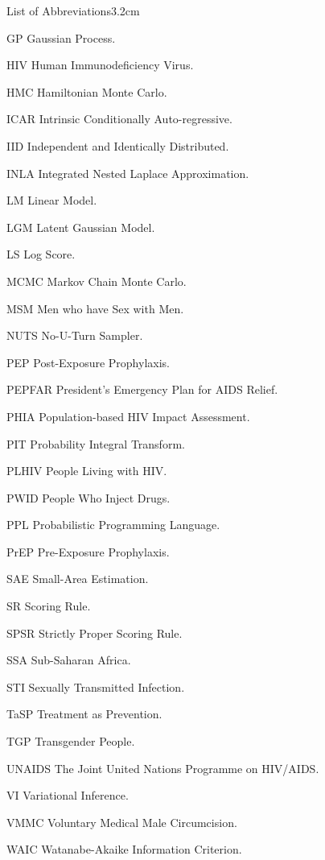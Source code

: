 \begin{mclistof}{List of Abbreviations}{3.2cm}
\item[GP] Gaussian Process.
\item[HIV] Human Immunodeficiency Virus.
\item[HMC] Hamiltonian Monte Carlo.
\item[ICAR] Intrinsic Conditionally Auto-regressive.
\item[IID] Independent and Identically Distributed.
\item[INLA] Integrated Nested Laplace Approximation.
\item[LM] Linear Model.
\item[LGM] Latent Gaussian Model.
\item[LS] Log Score.
\item[MCMC] Markov Chain Monte Carlo.
\item[MSM] Men who have Sex with Men.
\item[NUTS] No-U-Turn Sampler.
\item[PEP] Post-Exposure Prophylaxis.
\item[PEPFAR] President’s Emergency Plan for AIDS Relief.
\item[PHIA] Population-based HIV Impact Assessment.
\item[PIT] Probability Integral Transform.
\item[PLHIV] People Living with HIV.
\item[PWID] People Who Inject Drugs.
\item[PPL] Probabilistic Programming Language.
\item[PrEP] Pre-Exposure Prophylaxis.
\item[SAE] Small-Area Estimation.
\item[SR] Scoring Rule.
\item[SPSR] Strictly Proper Scoring Rule.
\item[SSA] Sub-Saharan Africa.
\item[STI] Sexually Transmitted Infection.
\item[TaSP] Treatment as Prevention.
\item[TGP] Transgender People.
\item[UNAIDS] The Joint United Nations Programme on HIV/AIDS.
\item[VI] Variational Inference.
\item[VMMC] Voluntary Medical Male Circumcision.
\item[WAIC] Watanabe-Akaike Information Criterion.

\end{mclistof} 
